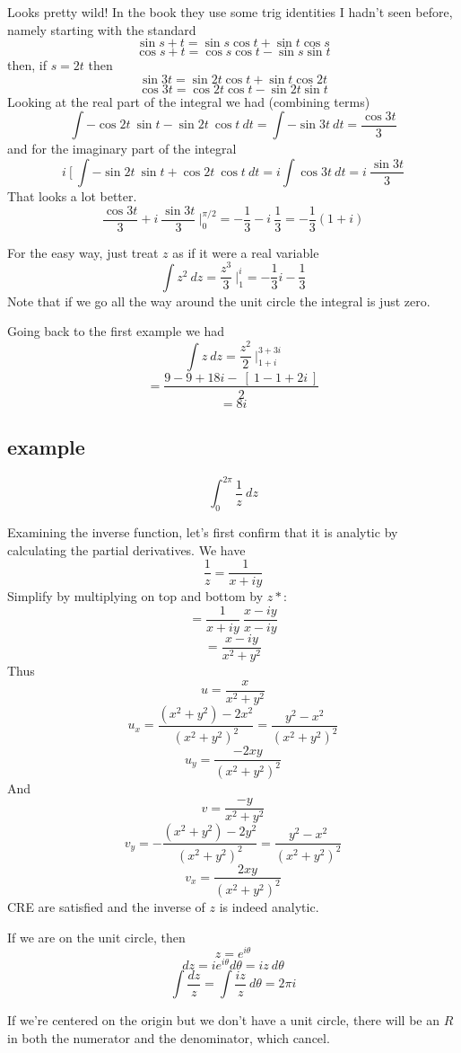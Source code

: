 \documentclass[11pt, oneside]{article}
\begin{document}
Looks pretty wild!  In the book they use some trig identities I hadn't seen before, namely starting with the standard
\[ \sin s + t = \sin s \cos t + \sin t \cos s  \]
\[ \cos s + t = \cos s \cos t - \sin s \sin t \]
then, if $s = 2t$ then
\[ \sin 3t = \sin 2t \cos t + \sin t \cos 2t \]
\[ \cos 3t = \cos 2t \cos t - \sin 2t \sin t \]
Looking at the real part of the integral we had (combining terms)
\[ \int -\cos 2t \  \sin t - \sin 2t \ \cos t \ dt = \int - \sin 3t \ dt = \frac{\cos 3t}{3} \]
and for the imaginary part of the integral
\[ i \ [ \ \int - \sin 2t \ \sin t + \cos 2t \ \cos t \ dt = i \int \cos 3t \ dt = i \ \frac{\sin 3t}{3} \]
That looks a lot better.
\[ \frac{\cos 3t}{3} + i \ \frac{\sin 3t}{3} \ \bigg |_0^{\pi/2} = - \frac{1}{3} - i \ \frac{1}{3} = - \frac{1}{3} (1 + i) \]

For the easy way, just treat $z$ as if it were a real variable
\[ \int z^2 \ dz = \frac{z^3}{3} \ \bigg |_1^i = - \frac{1}{3} i - \frac{1}{3} \]
Note that if we go all the way around the unit circle the integral is just zero.

Going back to the first example we had
\[ \int z \ dz = \frac{z^2}{2} \ \bigg |_{1 + i}^{3 + 3i} \]
\[ = \frac{9 - 9 + 18i - \ [ \ 1 - 1 + 2i \ ] }{2} \]
\[ = 8i \]

\subsection*{example}
\[ \int_0^{2\pi} \frac{1}{z} \ dz \]

Examining the inverse function, let's first confirm that it is analytic by calculating the partial derivatives.  We have
\[ \frac{1}{z} = \frac{1}{x + iy} \]
Simplify by multiplying on top and bottom by $z*$:
\[ = \frac{1}{x + iy} \ \frac{x-iy}{x- iy} \]
\[ = \frac{x - iy}{x^2 + y^2} \]
Thus
\[ u = \frac{x}{x^2 + y^2} \]
\[ u_x = \frac{(x^2 + y^2) - 2x^2}{(x^2 + y^2)^2} = \frac{y^2 - x^2}{(x^2 + y^2)^2} \]
\[ u_y = \frac{-2xy}{(x^2 + y^2)^2} \]
And
\[ v =  \frac{-y}{x^2 + y^2} \]
\[ v_y = - \frac{(x^2 + y^2) - 2y^2}{(x^2 + y^2)^2} = \frac{y^2 - x^2}{(x^2 + y^2)^2} \]
\[ v_x = \frac{2xy}{(x^2 + y^2)^2} \]
CRE are satisfied and the inverse of $z$ is indeed analytic.

If we are on the unit circle, then 
\[ z = e^{i\theta} \]
\[ dz = ie^{i\theta} d \theta = iz\ d \theta \]
\[ \int \frac{dz}{z} = \int \frac{iz}{z} \ d \theta = 2 \pi i \]

If we're centered on the origin but we don't have a unit circle, there will be an $R$ in both the numerator and the denominator, which cancel.
\end{document}
